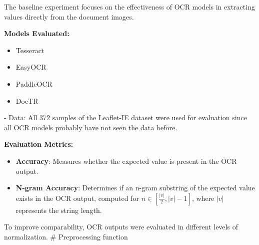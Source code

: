 \documentclass[11pt]{article}
\begin{document}
The baseline experiment focuses on the effectiveness of OCR models in extracting values directly from the document images.

\textbf{Models Evaluated:}
\begin{itemize}
    \item Tesseract
    \item EasyOCR
    \item PaddleOCR
    \item DocTR
\end{itemize}

- Data: All 372 samples of the Leaflet-IE dataset were used for evaluation since all OCR models probably have not seen the data before.

\textbf{Evaluation Metrics:}
\begin{itemize}
    \item \textbf{Accuracy}: Measures whether the expected value is present in the OCR output.
    \item \textbf{N-gram Accuracy}: Determines if an n-gram substring of the expected value exists in the OCR output, computed for $n \in \left[\frac{|v|}{2}, |v| - 1\right]$, where $|v|$ represents the string length.
\end{itemize}

To improve comparability, OCR outputs were evaluated in different levels of normalization.
# Preprocessing function
    
    
    

\end{document}
